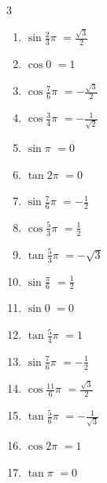 \begin{multicols}{3}
\begin{enumerate}
  \item $\displaystyle \sin{\frac{2}{3}\pi}$
        $\displaystyle =\frac{\sqrt{3}}{2}$

\columnbreak %

  \item $\displaystyle \cos{0}$
        $\displaystyle =1$

  \item $\displaystyle \cos{\frac{7}{6}\pi}$
        $\displaystyle =-\frac{\sqrt{3}}{2}$

  \item $\displaystyle \cos{\frac{3}{4}\pi}$
        $\displaystyle =-\frac{1}{\sqrt{2}}$

  \item $\displaystyle \sin{\pi}$
        $\displaystyle =0$

  \item $\displaystyle \tan{2\pi}$
        $\displaystyle =0$

  \item $\displaystyle \sin{\frac{7}{6}\pi}$
        $\displaystyle =-\frac{1}{2}$

  \item $\displaystyle \cos{\frac{5}{3}\pi}$
        $\displaystyle =\frac{1}{2}$

  \item $\displaystyle \tan{\frac{5}{3}\pi}$
        $\displaystyle =-\sqrt{3}$

  \item $\displaystyle \sin{\frac{\pi}{6}}$
        $\displaystyle =\frac{1}{2}$

  \item $\displaystyle \sin{0}$
        $\displaystyle =0$

  \item $\displaystyle \tan{\frac{5}{4}\pi}$
        $\displaystyle =1$

  \item $\displaystyle \sin{\frac{7}{6}\pi}$
        $\displaystyle =-\frac{1}{2}$

  \item $\displaystyle \cos{\frac{11}{6}\pi}$
        $\displaystyle =\frac{\sqrt{3}}{2}$

  \item $\displaystyle \tan{\frac{5}{6}\pi}$
        $\displaystyle =-\frac{1}{\sqrt{3}}$

  \item $\displaystyle \cos{2\pi}$
        $\displaystyle =1$

  \item $\displaystyle \tan{\pi}$
        $\displaystyle =0$


\end{enumerate}
\end{multicols}
